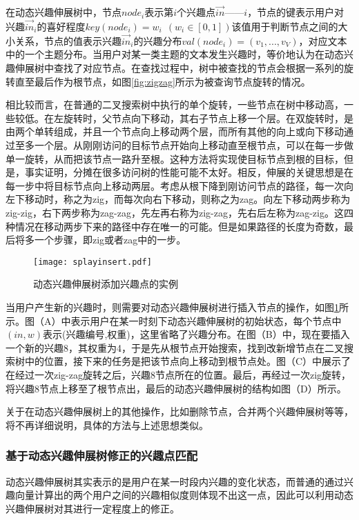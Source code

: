在动态兴趣伸展树中，节点$node_i$表示第$i$个兴趣点$\vec{in}——i$，节点的键表示用户对兴趣$\vec{in}_i$的喜好程度$key(node_i)=w_i~~(w_i\in [0,1])$该值用于判断节点之间的大小关系，节点的值表示兴趣$\vec{in}_i$的兴趣分布$val(node_i)=(v_1,...,v_V)$，对应文本中的一个主题分布。当用户对某一类主题的文本发生兴趣时，等价地认为在动态兴趣伸展树中查找了对应节点。在查找过程中，树中被查找的节点会根据一系列的旋转直至最后作为根节点，如图\ref{fig:zigzag}所示为被查询节点旋转的情况。

相比较而言，在普通的二叉搜索树中执行的单个旋转，一些节点在树中移动高，一些较低。在左旋转时，父节点向下移动，其右子节点上移一个层。在双旋转时，是由两个单转组成，并且一个节点向上移动两个层，而所有其他的向上或向下移动通过至多一个层。从刚刚访问的目标节点开始向上移动直至根节点，可以在每一步做单一旋转，从而把该节点一路升至根。这种方法将实现使目标节点到根的目标，但是，事实证明，分摊在很多访问树的性能可能不太好。相反，伸展的关键思想是在每一步中将目标节点向上移动两层。考虑从根下降到刚访问节点的路径，每一次向左下移动时，称之为zig，而每次向右下移动，则称之为zag。向左下移动两步称为zig-zig，右下两步称为zag-zag，先左再右称为zig-zag，先右后左称为zag-zig。这四种情况在移动两步下来的路径中存在唯一的可能。但是如果路径的长度为奇数，最后将多一个步骤，即zig或者zag中的一步。

\begin{figure}[ht]
\centering
\texttt{[image: splayinsert.pdf]}
\caption{动态兴趣伸展树添加兴趣点的实例}
\label{fig:splayinsert}
\end{figure}

当用户产生新的兴趣时，则需要对动态兴趣伸展树进行插入节点的操作，如图\ref{fig:splayinsert}所示。图（A）中表示用户在某一时刻下动态兴趣伸展树的初始状态，每个节点中$(in,w)$表示(兴趣编号,权重)，这里省略了兴趣分布。在图（B）中，现在要插入一个新的兴趣8，其权重为4，于是先从根节点开始搜索，找到改新增节点在二叉搜索树中的位置，接下来的任务是把该节点向上移动到根节点处。图（C）中展示了在经过一次zig-zag旋转之后，兴趣8节点所在的位置。最后，再经过一次zig旋转，将兴趣8节点上移至了根节点出，最后的动态兴趣伸展树的结构如图（D）所示。

关于在动态兴趣伸展树上的其他操作，比如删除节点，合并两个兴趣伸展树等等，将不再详细说明，具体的方法与上述思想类似。

\subsubsection{基于动态兴趣伸展树修正的兴趣点匹配}
动态兴趣伸展树其实表示的是用户在某一时段内兴趣的变化状态，而普通的通过兴趣向量计算出的两个用户之间的兴趣相似度则体现不出这一点，因此可以利用动态兴趣伸展树对其进行一定程度上的修正。

